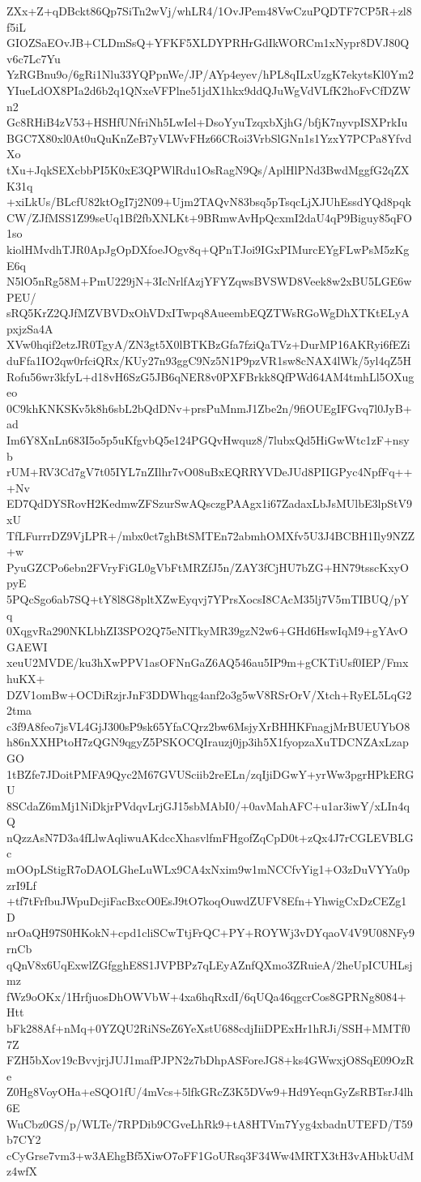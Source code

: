 ZXx+Z+qDBckt86Qp7SiTn2wVj/whLR4/1OvJPem48VwCzuPQDTF7CP5R+zl8f5iL
GIOZSaEOvJB+CLDmSsQ+YFKF5XLDYPRHrGdIkWORCm1xNypr8DVJ80Qv6c7Lc7Yu
YzRGBnu9o/6gRi1Nlu33YQPpnWe/JP/AYp4eyev/hPL8qILxUzgK7ekytsKl0Ym2
YIueLdOX8PIa2d6b2q1QNxeVFPlne51jdX1hkx9ddQJuWgVdVLfK2hoFvCfDZWn2
Gc8RHiB4zV53+HSHfUNfriNh5LwIel+DsoYyuTzqxbXjhG/bfjK7nyvpISXPrkIu
BGC7X80xl0At0uQuKnZeB7yVLWvFHz66CRoi3VrbSlGNn1s1YzxY7PCPa8YfvdXo
tXu+JqkSEXcbbPI5K0xE3QPWlRdu1OsRagN9Qs/AplHlPNd3BwdMggfG2qZXK31q
+xiLkUs/BLcfU82ktOgI7j2N09+Ujm2TAQvN83bsq5pTsqcLjXJUhEssdYQd8pqk
CW/ZJfMSS1Z99seUq1Bf2fbXNLKt+9BRmwAvHpQcxmI2daU4qP9Biguy85qFO1so
kiolHMvdhTJR0ApJgOpDXfoeJOgv8q+QPnTJoi9IGxPIMurcEYgFLwPsM5zKgE6q
N5lO5nRg58M+PmU229jN+3IcNrlfAzjYFYZqwsBVSWD8Veek8w2xBU5LGE6wPEU/
sRQ5KrZ2QJfMZVBVDxOhVDxITwpq8AueembEQZTWsRGoWgDhXTKtELyApxjzSa4A
XVw0hqif2etzJR0TgyA/ZN3gt5X0lBTKBzGfa7fziQaTVz+DurMP16AKRyi6fEZi
duFfa1IO2qw0rfciQRx/KUy27n93ggC9Nz5N1P9pzVR1sw8cNAX4lWk/5yl4qZ5H
Rofu56wr3kfyL+d18vH6SzG5JB6qNER8v0PXFBrkk8QfPWd64AM4tmhLl5OXugeo
0C9khKNKSKv5k8h6sbL2bQdDNv+prsPuMnmJ1Zbe2n/9fiOUEgIFGvq7l0JyB+ad
Im6Y8XnLn683I5o5p5uKfgvbQ5e124PGQvHwquz8/7lubxQd5HiGwWtc1zF+nsyb
rUM+RV3Cd7gV7t05IYL7nZIlhr7vO08uBxEQRRYVDeJUd8PIIGPyc4NpfFq+++Nv
ED7QdDYSRovH2KedmwZFSzurSwAQsczgPAAgx1i67ZadaxLbJsMUlbE3lpStV9xU
TfLFurrrDZ9VjLPR+/mbx0ct7ghBtSMTEn72abmhOMXfv5U3J4BCBH1Ily9NZZ+w
PyuGZCPo6ebn2FVryFiGL0gVbFtMRZfJ5n/ZAY3fCjHU7bZG+HN79tsscKxyOpyE
5PQcSgo6ab7SQ+tY8l8G8pltXZwEyqvj7YPrsXocsI8CAcM35lj7V5mTIBUQ/pYq
0XqgvRa290NKLbhZI3SPO2Q75eNITkyMR39gzN2w6+GHd6HswIqM9+gYAvOGAEWI
xeuU2MVDE/ku3hXwPPV1asOFNnGaZ6AQ546au5IP9m+gCKTiUsf0IEP/FmxhuKX+
DZV1omBw+OCDiRzjrJnF3DDWhqg4anf2o3g5wV8RSrOrV/Xtch+RyEL5LqG22tma
c3f9A8feo7jsVL4GjJ300sP9sk65YfaCQrz2bw6MsjyXrBHHKFnagjMrBUEUYbO8
h86nXXHPtoH7zQGN9qgyZ5PSKOCQIrauzj0jp3ih5X1fyopzaXuTDCNZAxLzapGO
1tBZfe7JDoitPMFA9Qyc2M67GVUSciib2reELn/zqIjiDGwY+yrWw3pgrHPkERGU
8SCdaZ6mMj1NiDkjrPVdqvLrjGJ15sbMAbI0/+0avMahAFC+u1ar3iwY/xLIn4qQ
nQzzAsN7D3a4fLlwAqliwuAKdccXhasvlfmFHgofZqCpD0t+zQx4J7rCGLEVBLGc
mOOpLStigR7oDAOLGheLuWLx9CA4xNxim9w1mNCCfvYig1+O3zDuVYYa0pzrI9Lf
+tf7tFrfbuJWpuDcjiFacBxcO0EsJ9tO7koqOuwdZUFV8Efn+YhwigCxDzCEZg1D
nrOaQH97S0HKokN+cpd1cliSCwTtjFrQC+PY+ROYWj3vDYqaoV4V9U08NFy9rnCb
qQnV8x6UqExwlZGfgghE8S1JVPBPz7qLEyAZnfQXmo3ZRuieA/2heUpICUHLsjmz
fWz9oOKx/1HrfjuosDhOWVbW+4xa6hqRxdI/6qUQa46qgcrCos8GPRNg8084+Htt
bFk288Af+nMq+0YZQU2RiNSeZ6YeXstU688cdjIiiDPExHr1hRJi/SSH+MMTf07Z
FZH5bXov19cBvvjrjJUJ1mafPJPN2z7bDhpASForeJG8+ks4GWwxjO8SqE09OzRe
Z0Hg8VoyOHa+eSQO1fU/4mVcs+5lfkGRcZ3K5DVw9+Hd9YeqnGyZsRBTsrJ4lh6E
WuCbz0GS/p/WLTe/7RPDib9CGveLhRk9+tA8HTVm7Yyg4xbadnUTEFD/T59b7CY2
cCyGrse7vm3+w3AEhgBf5XiwO7oFF1GoURsq3F34Ww4MRTX3tH3vAHbkUdMz4wfX
